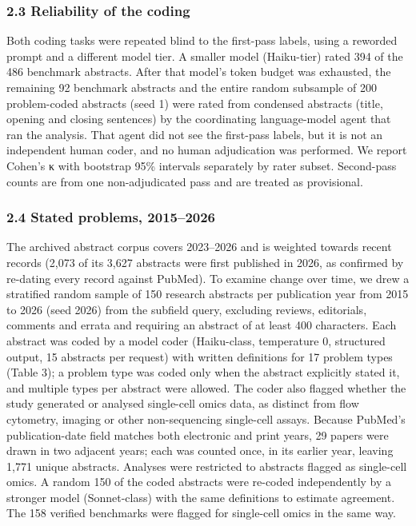\documentclass[11pt]{article}
\begin{document}
\subsubsection{2.3 Reliability of the
coding}\label{reliability-of-the-coding}

Both coding tasks were repeated blind to the first-pass labels, using a
reworded prompt and a different model tier. A smaller model (Haiku-tier)
rated 394 of the 486 benchmark abstracts. After that model's token
budget was exhausted, the remaining 92 benchmark abstracts and the
entire random subsample of 200 problem-coded abstracts (seed 1) were
rated from condensed abstracts (title, opening and closing sentences) by
the coordinating language-model agent that ran the analysis. That agent
did not see the first-pass labels, but it is not an independent human
coder, and no human adjudication was performed. We report Cohen's κ with
bootstrap 95\% intervals separately by rater subset. Second-pass counts
are from one non-adjudicated pass and are treated as provisional.

\subsubsection{2.4 Stated problems,
2015--2026}\label{stated-problems-20152026}

The archived abstract corpus covers 2023--2026 and is weighted towards
recent records (2,073 of its 3,627 abstracts were first published in
2026, as confirmed by re-dating every record against PubMed). To examine
change over time, we drew a stratified random sample of 150 research
abstracts per publication year from 2015 to 2026 (seed 2026) from the
subfield query, excluding reviews, editorials, comments and errata and
requiring an abstract of at least 400 characters. Each abstract was
coded by a model coder (Haiku-class, temperature 0, structured output,
15 abstracts per request) with written definitions for 17 problem types
(Table 3); a problem type was coded only when the abstract explicitly
stated it, and multiple types per abstract were allowed. The coder also
flagged whether the study generated or analysed single-cell omics data,
as distinct from flow cytometry, imaging or other non-sequencing
single-cell assays. Because PubMed's publication-date field matches both
electronic and print years, 29 papers were drawn in two adjacent years;
each was counted once, in its earlier year, leaving 1,771 unique
abstracts. Analyses were restricted to abstracts flagged as single-cell
omics. A random 150 of the coded abstracts were re-coded independently
by a stronger model (Sonnet-class) with the same definitions to estimate
agreement. The 158 verified benchmarks were flagged for single-cell
omics in the same way.
\end{document}
